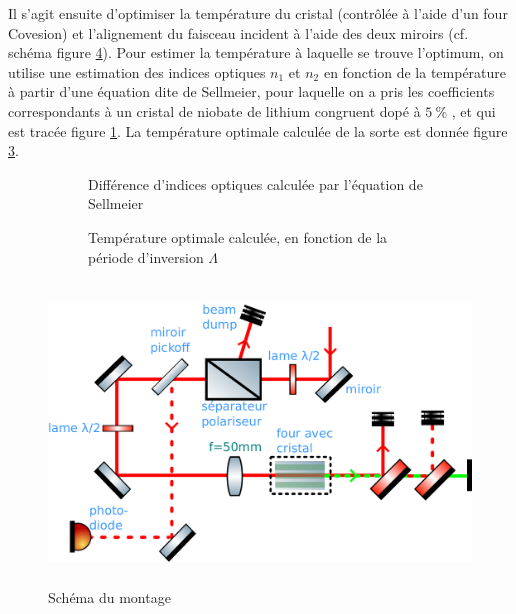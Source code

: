 \documentclass[11pt,a4paper] { article}
\begin{document}
 Il s'agit ensuite d'optimiser la température du cristal (contrôlée à l'aide d'un four Covesion) et l'alignement du faisceau incident à l'aide des deux miroirs (cf. schéma figure \ref{fig:montage}). Pour estimer la température à laquelle se trouve l'optimum, on utilise une estimation des indices optiques $n_1$ et $n_2$ en fonction de la température à partir d'une équation dite de Sellmeier, pour laquelle on a pris les coefficients correspondants à un cristal de niobate de lithium congruent dopé à $\SI{5}{\percent}$ \cite{gayer,covesion}, et qui est tracée figure \ref{fig:sellmeier}. La température optimale calculée de la sorte est donnée figure \ref{fig:lp}.

\begin{figure}[htpb]
\centering
\hspace*{-0.8cm}
\begin{subfigure}[h]{0.48\textwidth}
	\centering
	
	\caption{Différence d'indices optiques calculée par l'équation de Sellmeier}
	\label{fig:sellmeier}
\end{subfigure}
\centering
\hspace*{0.8cm}
\begin{subfigure}[h]{0.48\textwidth}
	
	\caption{Température optimale calculée, en fonction de la période d'inversion $\Lambda$}
    \label{fig:lp}
\end{subfigure}
\caption{}
\end{figure}



\begin{figure}[h]
	\centering
	\includegraphics[height=8cm]{./img/schema.pdf}
	\caption{Schéma du montage}
	\label{fig:montage}
\end{figure}
\end{document}
